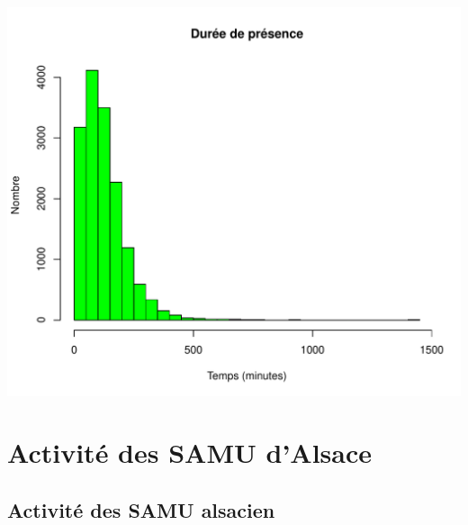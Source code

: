 \documentclass[12pt,english,french,twoside]{report}\usepackage[]{graphicx}\usepackage[]{color}
\makeatletter
\def\maxwidth{ %
  \ifdim\Gin@nat@width>\linewidth
    \linewidth
  \else
    \Gin@nat@width
  \fi
}
\newenvironment{knitrout}{}{} %
\makeatother
\begin{document}
\begin{knitrout}
\color{fgcolor}
\includegraphics[width=\maxwidth]{figure/graphe_3fr} 

\end{knitrout}



\part{Activité des SAMU d'Alsace}







\chapter{Activité des SAMU alsacien}
\end{document}
